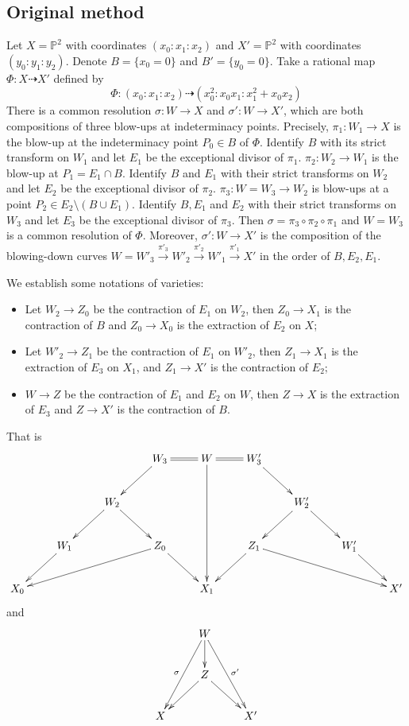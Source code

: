 \documentclass[11pt]{amsart}
\begin{document}
\subsection{Original method}\label{example1}
Let $ X=\mathbb{P}^2 $ with coordinates $ (x_0:x_1:x_2) $ and $ X'=\mathbb{P}^2 $ with coordinates $ (y_0:y_1:y_2) $.
Denote $ B=\{x_0=0\} $ and $B'=\{y_{0}=0\} $.
Take a rational map $ \Phi:X\dashrightarrow X' $ defined by
\[ \Phi:(x_0:x_1:x_2)\dashrightarrow (x_0^2:x_0x_1:x_1^2+x_0x_2) \]
There is a  common resolution $\sigma: W\to X$ and $\sigma':W\to X'$, which are both compositions of three blow-ups at indeterminacy points.
Precisely, $\pi_{1}:W_{1}\to X$ is the blow-up at the indeterminacy point $P_{0} \in B$ of $\Phi$. Identify $B$ with its strict transform on $W_{1}$ and let $E_{1}$ be the exceptional divisor of $\pi_{1}$.
$\pi_{2}:W_{2}\to W_{1}$ is the blow-up at $P_{1}=E_{1} \cap B$. Identify $B$ and $E_{1}$ with their strict transforms on $W_{2}$ and let $E_{2}$ be the exceptional divisor of $\pi_{2}$.
$\pi_{3}:W=W_{3}\to W_{2}$ is blow-ups at a point $P_{2} \in E_{2} \setminus (B\cup E_{1})$. Identify  $B, E_{1}$ and $E_{2}$ with their strict transforms   on $W_{3}$ and let $E_{3}$ be the exceptional divisor of $\pi_{3}$.
Then $ \sigma=\pi_{3}\circ \pi_{2} \circ \pi_{1} $ and $ W=W_3 $ is a common resolution of $\Phi$. Moreover, $ \sigma':W\to X' $ is the composition of the blowing-down curves  $W=W'_{3}\xrightarrow{\pi'_{3}} W'_{2}\xrightarrow{\pi'_{2}} W'_{1} \xrightarrow{\pi'_{1}} X'$ in the order of $ B,E_2,E_1 $.

We establish some notations of varieties:
\begin{itemize}
  \item Let $W_{2}\to Z_{0}$ be the contraction of $E_{1}$ on $W_{2}$, then $Z_{0} \to X_{1}$ is the contraction of $B$  and $Z_{0}\to X_{0}$ is the extraction of $E_{2}$ on $X$;
  \item Let $W'_{2}\to Z_{1}$ be the contraction of $E_{1}$ on $W'_{2}$, then $Z_{1} \to X_{1}$ is the extraction of $E_{3}$ on $X_{1}$, and $Z_{1}\to X'$ is the contraction of $E_{2}$;
  \item $W\to Z$ be the contraction of $E_{1}$ and $E_{2}$ on $W$, then $Z\to X$ is the extraction of $E_{3}$ and $Z\to X'$ is the contraction of $B$.
\end{itemize}
That is
\[ \xymatrix{&&&W_3\ar[ld]\ar@{=}[r]&W\ar[ddd]\ar@{=}[r]&W_3'\ar[rd]\\
    &&W_2\ar[ld]\ar[rd]&&&&W_2'\ar[rd]\ar[dl]\\
    &W_1\ar[ld]&&Z_0\ar[llld]\ar[rd]&&Z_1\ar[ld]\ar[rrrd]&&W_1'\ar[rd]\\
    X_0&&&&X_1&&&&X'
  } \]
and
\[\xymatrix{
    &W\ar[d]\ar[ddl]_{\sigma}\ar[ddr]^{\sigma'}&\\
    &Z\ar[dl]\ar[dr]\\
    X&&X' }  \]
\end{document}
